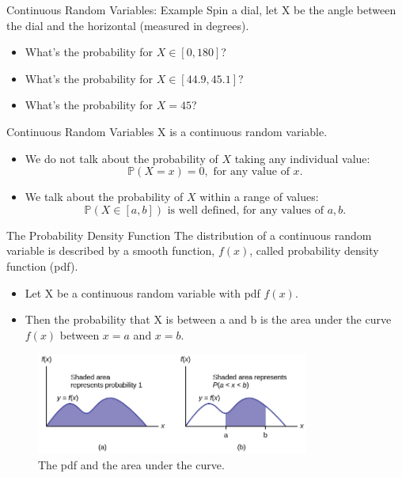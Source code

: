 \documentclass{beamer}
\newcommand{\pr}{\mathbb{P}}
\begin{document}
\begin{frame}{Continuous Random Variables: Example}
Spin a dial, let X be the angle between the dial and the horizontal (measured in degrees). 
\begin{itemize}
\item What's the probability for $X \in [0, 180]$?
\item What's the probability for $X \in [44.9, 45.1]$?
\item What's the probability for $X = 45$? 
\end{itemize}
\end{frame}

\begin{frame}{Continuous Random Variables}
X is a continuous random variable. 
\begin{itemize}
\item We do not talk about the probability of $X$ taking any \alert{individual value}:
$$\pr(X=x)=0, \text{ for any value of }x.$$
\item We talk about the probability of $X$ \alert{within a range of values}:
$$\pr(X \in [a,b]) \text{ is well defined, for any values of }a, b.$$
\end{itemize}
\end{frame}

\begin{frame}{The Probability Density Function}
The distribution of a continuous random variable is described by a smooth function, $f(x)$, 
called probability density function (pdf).
\begin{itemize}
\item Let X be a continuous random variable with pdf $f(x)$.
\item Then the probability that X is between a and b is the \alert{area under the curve} $f(x)$ between $x=a$ and $x=b$.
\end{itemize}
\begin{figure}
    \caption{The pdf and the area under the curve.}
    \includegraphics[width=0.8\textwidth]{figures/pdf.jpg}
\end{figure}
\end{frame}
\end{document}
